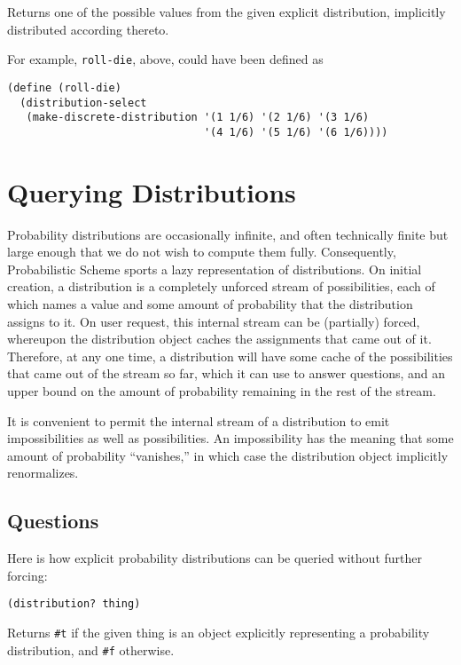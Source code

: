 \documentclass[12pt]{article}
\newcommand{\code}[1]{\texttt{#1}}
\begin{document}
Returns one of the possible values from the given explicit
distribution, implicitly distributed according thereto.

For example, \code{roll-die}, above, could have been defined as
\begin{verbatim}
(define (roll-die)
  (distribution-select
   (make-discrete-distribution '(1 1/6) '(2 1/6) '(3 1/6)
                               '(4 1/6) '(5 1/6) '(6 1/6))))
\end{verbatim}

\section{Querying Distributions}
\label{querying}

Probability distributions are occasionally infinite, and often
technically finite but large enough that we do not wish to compute
them fully.  Consequently, Probabilistic Scheme sports a lazy
representation of distributions.  On initial creation, a distribution
is a completely unforced stream of possibilities, each of which names
a value and some amount of probability that the distribution assigns
to it.  On user request, this internal stream can be (partially)
forced, whereupon the distribution object caches the assignments that
came out of it.  Therefore, at any one time, a distribution will have
some cache of the possibilities that came out of the stream so far,
which it can use to answer questions, and an upper bound on the amount
of probability remaining in the rest of the stream.

It is convenient to permit the internal stream of a distribution
to emit impossibilities as well as possibilities.  An impossibility
has the meaning that some amount of probability ``vanishes,'' in
which case the distribution object implicitly renormalizes.

\subsection{Questions}

Here is how explicit probability distributions can be queried without
further forcing:

\begin{verbatim}
(distribution? thing)
\end{verbatim}

Returns \code{\#t} if the given thing is an object explicitly
representing a probability distribution, and \code{\#f} otherwise.
\end{document}
